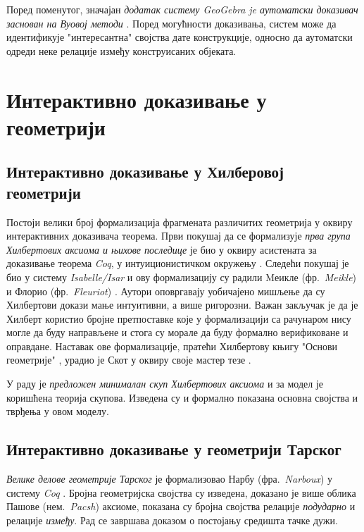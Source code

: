 Поред поменутог, значајан \emph{додатак систему GeoGebra je аутоматски
  доказивач заснован на Вуовој методи}
\cite{botana2015automated}. Поред могућности доказивања, систем може
да идентификује "интересантна" својства дате конструкције, односно да
аутоматски одреди неке релације између конструисаних објеката.


\section{Интерактивно доказивање у геометрији}

\subsection{Интерактивно доказивање у Хилберовој геометрији }

Постоји велики број формализација фрагмената различитих геометрија у
оквиру инте\-ра\-кти\-вних доказивача теорема.  Први покушај да се
формализује \emph{прва група Хилбертових аксиома и њихове последице}
је био у оквиру асистената за доказивање теорема \emph{Coq}, у
интуиционистичком окружењу \cite{hilbert-coq}. Следећи покушај је био
у систему \emph{Isabelle/Isar} и ову формализацију су радили Mеикле
(фр.~\emph{Meikle}) и Флорио (фр.~\emph{Fleuriot})
\cite{hilbert-isabelle}. Аутори оповргавају уобичајено мишљење да су
Хилбертови докази мање интуитивни, а више ригорозни. Важан закључак је
да је Хилберт користио бројне претпоставке које у формализацији са
рачунаром нису могле да буду направљене и стога су морале да буду
формално верификоване и оправдане. Наставак ове формализације, пратећи
Хилбертову књигу "Основи геометрије" \cite{hilbert}, урадио је Скот у
оквиру своје мастер тезе \cite{scott2008mechanising}.

У раду \cite{william} је \emph{предложен минималан скуп Хилбертових
  аксиома} и за модел је коришћена теорија скупова. Изведена су и
формално показана основна својства и тврђења у овом моделу.

\subsection{Интерактивно доказивање у геометрији Тарског}

\emph{Велике делове геометрије Тарског} \cite{tarski} је формализовао
Нарбу (фра.~\emph{Narboux}) у систему \emph{Coq}
\cite{narboux-tarski}. Бројна геометријска својства су изведена,
доказано је више облика Пашове (нем.~\emph{Pacsh}) аксиоме, показана
су бројна својства релације \emph{подударно} и релације
\emph{између}. Рад се завршава доказом о постојању средишта тачке
дужи.

